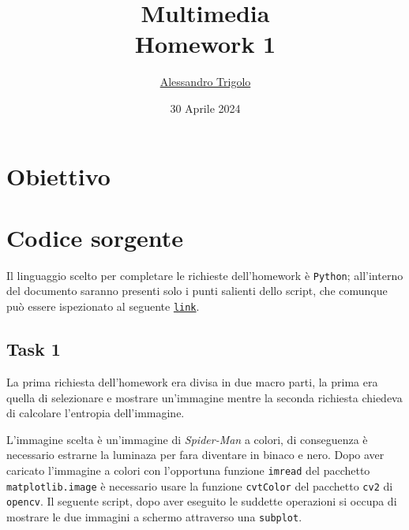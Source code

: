 \title{\vspace{160px} \textbf{\huge{Multimedia}} \\\vspace{17.5px} \LARGE{Homework 1}  \vspace{10px}}
\author{\href{https://github.com/imAlessas}{Alessandro Trigolo}}
\date{30 Aprile 2024}



\maketitle\newpage




\section{Obiettivo}



\section{Codice sorgente}
Il linguaggio scelto per completare le richieste dell'homework è \texttt{Python}; all'interno del documento saranno presenti solo i punti salienti dello script, che comunque può essere ispezionato al seguente \href{https://github.com/imAlessas/computer-networks/blob/main/multimedia/hw-1/script/lossless_coding.py}{\texttt{link}}.


\subsection*{Task 1}

La prima richiesta dell'homework era divisa in due macro parti, la prima era quella di selezionare e mostrare un'immagine mentre la seconda richiesta chiedeva di calcolare l'entropia dell'immagine.

L'immagine scelta è un'immagine di \textsl{Spider-Man} a colori, di conseguenza è necessario estrarne la luminaza per fara diventare in binaco e nero. Dopo aver caricato l'immagine a colori con l'opportuna funzione \texttt{imread} del pacchetto \texttt{matplotlib.image} è necessario usare la funzione \texttt{cvtColor} del pacchetto \texttt{cv2} di \texttt{opencv}. Il seguente script, dopo aver eseguito le suddette operazioni si occupa di mostrare le due immagini a schermo attraverso una \texttt{subplot}.


